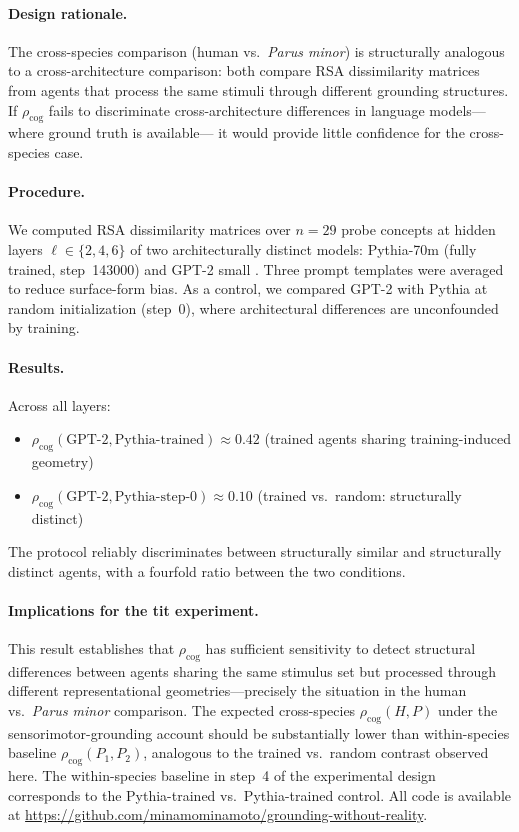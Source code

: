 \documentclass[12pt]{article}
\begin{document}
\paragraph{Design rationale.}
The cross-species comparison (human vs.\ \textit{Parus minor})
is structurally analogous to a cross-architecture comparison:
both compare RSA dissimilarity matrices from agents that process
the same stimuli through different grounding structures.
If $\rho_\mathrm{cog}$ fails to discriminate cross-architecture
differences in language models---where ground truth is available---
it would provide little confidence for the cross-species case.

\paragraph{Procedure.}
We computed RSA dissimilarity matrices over $n = 29$ probe concepts
at hidden layers $\ell \in \{2, 4, 6\}$ of two architecturally
distinct models: Pythia-70m \citep{biderman2023} (fully trained,
step~143000) and GPT-2 small \citep{radford2019language}.
Three prompt templates were averaged to reduce surface-form bias.
As a control, we compared GPT-2 with Pythia at random
initialization (step~0), where architectural differences are
unconfounded by training.

\paragraph{Results.}
Across all layers:
\begin{itemize}
  \item $\rho_\mathrm{cog}(\text{GPT-2}, \text{Pythia-trained})
    \approx 0.42$ (trained agents sharing training-induced geometry)
  \item $\rho_\mathrm{cog}(\text{GPT-2}, \text{Pythia-step-0})
    \approx 0.10$ (trained vs.\ random: structurally distinct)
\end{itemize}
The protocol reliably discriminates between structurally similar
and structurally distinct agents, with a fourfold ratio between
the two conditions.

\paragraph{Implications for the tit experiment.}
This result establishes that $\rho_\mathrm{cog}$ has sufficient
sensitivity to detect structural differences between agents
sharing the same stimulus set but processed through different
representational geometries---precisely the situation in the
human vs.\ \textit{Parus minor} comparison.
The expected cross-species $\rho_\mathrm{cog}(H, P)$ under
the sensorimotor-grounding account should be substantially
lower than within-species baseline $\rho_\mathrm{cog}(P_1, P_2)$,
analogous to the trained vs.\ random contrast observed here.
The within-species baseline in step~4 of the experimental design
corresponds to the Pythia-trained vs.\ Pythia-trained control.
All code is available at
\url{https://github.com/minamominamoto/grounding-without-reality}.
\end{document}
